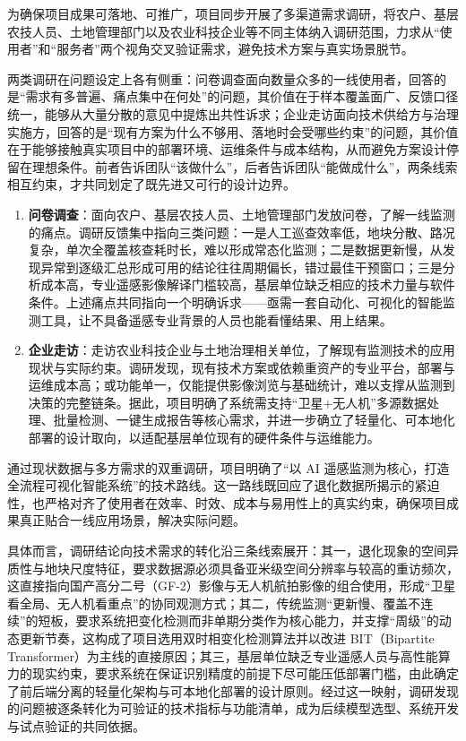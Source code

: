 \documentclass[12pt, a4paper]{ctexart}
\begin{document}
为确保项目成果可落地、可推广，项目同步开展了多渠道需求调研，将农户、基层农技人员、土地管理部门以及农业科技企业等不同主体纳入调研范围，力求从“使用者”和“服务者”两个视角交叉验证需求，避免技术方案与真实场景脱节。

两类调研在问题设定上各有侧重：问卷调查面向数量众多的一线使用者，回答的是“需求有多普遍、痛点集中在何处”的问题，其价值在于样本覆盖面广、反馈口径统一，能够从大量分散的意见中提炼出共性诉求；企业走访面向技术供给方与治理实施方，回答的是“现有方案为什么不够用、落地时会受哪些约束”的问题，其价值在于能够接触真实项目中的部署环境、运维条件与成本结构，从而避免方案设计停留在理想条件。前者告诉团队“该做什么”，后者告诉团队“能做成什么”，两条线索相互约束，才共同划定了既先进又可行的设计边界。

\begin{enumerate}
    \item \textbf{问卷调查}：面向农户、基层农技人员、土地管理部门发放问卷，了解一线监测的痛点。调研反馈集中指向三类问题：一是人工巡查效率低，地块分散、路况复杂，单次全覆盖核查耗时长，难以形成常态化监测；二是数据更新慢，从发现异常到逐级汇总形成可用的结论往往周期偏长，错过最佳干预窗口；三是分析成本高，专业遥感影像解译门槛较高，基层单位缺乏相应的技术力量与软件条件。上述痛点共同指向一个明确诉求——亟需一套自动化、可视化的智能监测工具，让不具备遥感专业背景的人员也能看懂结果、用上结果。
    \item \textbf{企业走访}：走访农业科技企业与土地治理相关单位，了解现有监测技术的应用现状与实际约束。调研发现，现有技术方案或依赖重资产的专业平台，部署与运维成本高；或功能单一，仅能提供影像浏览与基础统计，难以支撑从监测到决策的完整链条。据此，项目明确了系统需支持“卫星+无人机”多源数据处理、批量检测、一键生成报告等核心需求，并进一步确立了轻量化、可本地化部署的设计取向，以适配基层单位现有的硬件条件与运维能力。
\end{enumerate}

通过现状数据与多方需求的双重调研，项目明确了“以 AI 遥感监测为核心，打造全流程可视化智能系统”的技术路线。这一路线既回应了退化数据所揭示的紧迫性，也严格对齐了使用者在效率、时效、成本与易用性上的真实约束，确保项目成果真正贴合一线应用场景，解决实际问题。

具体而言，调研结论向技术需求的转化沿三条线索展开：其一，退化现象的空间异质性与地块尺度特征，要求数据源必须具备亚米级空间分辨率与较高的重访频次，这直接指向国产高分二号（GF-2）影像与无人机航拍影像的组合使用，形成“卫星看全局、无人机看重点”的协同观测方式；其二，传统监测“更新慢、覆盖不连续”的短板，要求系统把变化检测而非单期分类作为核心能力，并支撑“周级”的动态更新节奏，这构成了项目选用双时相变化检测算法并以改进 BIT（Bipartite Transformer）为主线的直接原因；其三，基层单位缺乏专业遥感人员与高性能算力的现实约束，要求系统在保证识别精度的前提下尽可能压低部署门槛，由此确定了前后端分离的轻量化架构与可本地化部署的设计原则。经过这一映射，调研发现的问题被逐条转化为可验证的技术指标与功能清单，成为后续模型选型、系统开发与试点验证的共同依据。
\end{document}
